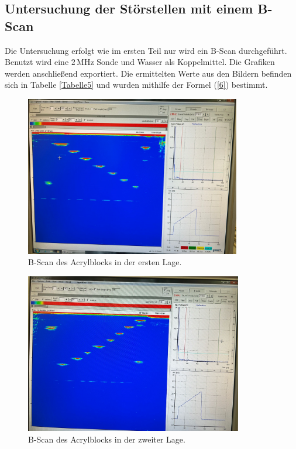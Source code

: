 \subsection{Untersuchung der Störstellen mit einem B-Scan}

\begin{flushleft}
    Die Untersuchung erfolgt wie im ersten Teil nur wird ein B-Scan durchgeführt.
    Benutzt wird eine $ 2\,\unit{\mega\hertz} $ Sonde und Wasser als Koppelmittel.
    Die Grafiken werden anschließend exportiert. 
    Die ermittelten Werte aus den Bildern befinden sich in Tabelle \ref{Tabelle5} und wurden mithilfe der Formel (\ref{6}) bestimmt.
\end{flushleft}

\begin{figure}[H]
    \centering
    \includegraphics[height=70mm]{bilder/Bscan2.jpeg}
    \caption{B-Scan des Acrylblocks in der ersten Lage.\label{Abbildung3} }
\end{figure}

\begin{figure}[H]
    \centering
    \includegraphics[height=70mm]{bilder/Bscan1.jpeg}
    \caption{B-Scan des Acrylblocks in der zweiter Lage.\label{Abbildung4} }
\end{figure}

